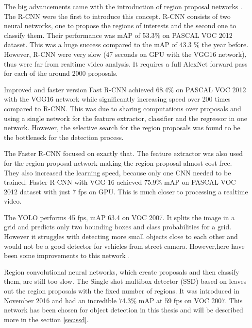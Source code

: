 \documentclass[a4paper,12pt,titlepage]{article}
\numberwithin{figure}{section}
\begin{document}
The big advancements came with the introduction of region proposal networks \cite{girshick2016region}. The R-CNN \cite{DBLP:journals/corr/GirshickDDM13} were the first to introduce this concept. R-CNN consists of two neural networks, one to propose the regions of interests and the second one to classify them. Their performance was mAP of 53.3\% on PASCAL VOC 2012 dataset. This was a huge success compared to the mAP of 43.3 \%\cite{carreira2012cpmc} the year before. However, R-CNN were very slow (47 seconds on GPU with the VGG16 \cite{simonyan2014very} network), thus were far from realtime video analysis. It requires a full AlexNet forward pass for each of the around 2000 proposals.

Improved and faster version Fast R-CNN \cite{girshick2015fast} achieved 68.4\% on PASCAL VOC 2012 with the VGG16 network while significantly increasing speed over 200 times compared to R-CNN. This was due to sharing computations over proposals and using a single network for the feature extractor, classifier and the regressor in one network. However, the selective search for the region proposals was found to be the bottleneck for the detection process.

The Faster R-CNN focused on exactly that. The feature extractor was also used for the region proposal network making the region proposal almost cost free. They also increased the learning speed, because only one CNN needed to be trained. Faster R-CNN with VGG-16 achieved 75.9\% mAP on PASCAL VOC 2012 dataset with just 7 fps on GPU. This is much closer to processing a realtime video.

The YOLO\cite{redmon2016you} performs 45 fps, mAP 63.4 on VOC 2007. It splits the image in a grid and predicts only two bounding boxes and class probabilities for a grid. However it struggles with detecting more small objects close to each other and would not be a good detector for vehicles from street camera. However,here have been some improvements to this network \cite{redmon2017yolo9000, redmon2018yolov3}.

Region convolutional neural networks, which create proposals and then classify them, are still too slow. The Single shot multibox detector (SSD) \cite{liu2016ssd} based on \cite{erhan2014scalable} leaves out the region proposals with the fixed number of regions. It was introduced in November 2016 and had an incredible 74.3\% mAP at 59 fps on VOC 2007. This network has been chosen for object detection in this thesis and will be described more in the section \ref{sec:ssd}. 
\end{document}
